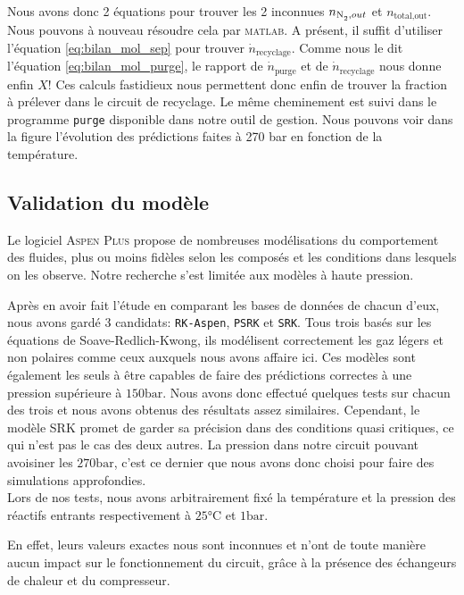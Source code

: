 \documentclass[a4paper, oneside, 12pt]{article}
\begin{document}
Nous avons donc 2 équations pour trouver 
les 2 inconnues $n_{\ce{N2},out}$ et $n_{\text{total,out}}$. 
Nous pouvons à nouveau résoudre cela par \textsc{matlab}. 
A présent, il suffit d'utiliser l'équation \ref{eq:bilan_mol_sep} 
pour trouver $\dot{n}_{\text{recyclage}}$. 
Comme nous le dit l'équation \ref{eq:bilan_mol_purge}, 
le rapport de $\dot{n}_{\text{purge}}$ 
et de $\dot{n}_{\text{recyclage}}$ nous donne enfin $X$! 
Ces calculs fastidieux nous permettent donc enfin de trouver la fraction à prélever 
dans le circuit de recyclage. 
Le même cheminement est suivi dans le programme \texttt{purge} 
disponible dans notre outil de gestion. Nous pouvons voir dans la figure %
l'évolution des prédictions faites à 270 bar en fonction de la température.

\subsection{Validation du modèle}

Le logiciel \textsc{Aspen Plus} propose de nombreuses 
modélisations du comportement des fluides, 
plus ou moins fidèles selon les composés et 
les conditions dans lesquels on les observe. 
Notre recherche s'est limitée aux modèles à haute pression. 

Après en avoir fait l'étude en comparant les bases de données de chacun d'eux, 
nous avons gardé 3 candidats: \texttt{RK-Aspen}, \texttt{PSRK} et \texttt{SRK}. 
Tous trois basés sur les équations de Soave-Redlich-Kwong, 
ils modélisent correctement les gaz légers et non polaires 
comme ceux auxquels nous avons affaire ici. 
Ces modèles sont également les seuls à être capables de faire 
des prédictions correctes à une pression supérieure à $150\si{\bar}$. 
Nous avons donc effectué quelques tests sur chacun des trois 
et nous avons obtenus des résultats assez similaires.
Cependant, le modèle SRK promet de garder sa précision dans des conditions 
quasi critiques, ce qui n'est pas le cas des deux autres. 
La pression dans notre circuit pouvant avoisiner les $270\si{\bar}$, 
c'est ce dernier que nous avons donc choisi pour faire des simulations approfondies.\\
Lors de nos tests, nous avons arbitrairement fixé la température et 
la pression des réactifs entrants respectivement à $25\si{\degreeCelsius}$ et $1\si{\bar}$.

En effet, leurs valeurs exactes nous sont inconnues et n'ont de toute manière 
aucun impact sur le fonctionnement du circuit, grâce à la présence des échangeurs de chaleur 
et du compresseur.
\end{document}
